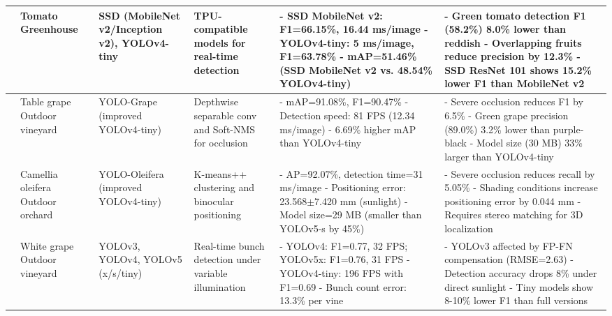 \documentclass[pdflatex,sn-mathphys-num]{sn-jnl}
\begin{document}
\begin{table}[htbp]
\begin{tabular}{p{1cm}p{1.2cm}p{1cm}p{2cm}p{2.5cm}p{2.8cm}}
	\cite{magalhaes2021evaluating} \newline 2021 & Tomato \newline Greenhouse & SSD (MobileNet v2/Inception v2), YOLOv4-tiny & TPU-compatible models for real-time detection & - SSD MobileNet v2: F1=66.15\%, 16.44 ms/image \newline - YOLOv4-tiny: 5 ms/image, F1=63.78\% \newline - mAP=51.46\% (SSD MobileNet v2 vs. 48.54\% YOLOv4-tiny) & - Green tomato detection F1 (58.2\%) 8.0\% lower than reddish \newline - Overlapping fruits reduce precision by 12.3\% \newline - SSD ResNet 101 shows 15.2\% lower F1 than MobileNet v2 \\ \midrule
	\cite{li2021real} \newline 2021 & Table grape \newline Outdoor vineyard & YOLO-Grape (improved YOLOv4-tiny) & Depthwise separable conv and Soft-NMS for occlusion & - mAP=91.08\%, F1=90.47\% \newline - Detection speed: 81 FPS (12.34 ms/image) \newline - 6.69\% higher mAP than YOLOv4-tiny & - Severe occlusion reduces F1 by 6.5\% \newline - Green grape precision (89.0\%) 3.2\% lower than purple-black \newline - Model size (30 MB) 33\% larger than YOLOv4-tiny \\ \midrule
	\cite{tang2023fruit} \newline 2023 & Camellia oleifera \newline Outdoor orchard & YOLO-Oleifera (improved YOLOv4-tiny) & K-means++ clustering and binocular positioning & - AP=92.07\%, detection time=31 ms/image \newline - Positioning error: 23.568$\pm$7.420 mm (sunlight) \newline - Model size=29 MB (smaller than YOLOv5-s by 45\%) & - Severe occlusion reduces recall by 5.05\% \newline - Shading conditions increase positioning error by 0.044 mm \newline - Requires stereo matching for 3D localization \\ \midrule
	\cite{sozzi2022automatic} \newline 2022 & White grape \newline Outdoor vineyard & YOLOv3, YOLOv4, YOLOv5 (x/s/tiny) & Real-time bunch detection under variable illumination & - YOLOv4: F1=0.77, 32 FPS; YOLOv5x: F1=0.76, 31 FPS \newline - YOLOv4-tiny: 196 FPS with F1=0.69 \newline - Bunch count error: 13.3\% per vine & - YOLOv3 affected by FP-FN compensation (RMSE=2.63) \newline - Detection accuracy drops 8\% under direct sunlight \newline - Tiny models show 8-10\% lower F1 than full versions \\ \midrule

\end{tabular}
\end{table}
\end{document}
